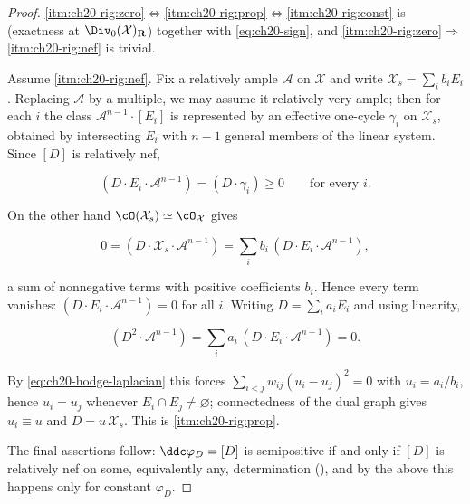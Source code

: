 \begin{proof}
\cref{itm:ch20-rig:zero}$\Leftrightarrow$\cref{itm:ch20-rig:prop}$\Leftrightarrow$\cref{itm:ch20-rig:const}
is  (exactness at
$\Div_0(\mathcal X)_{\mathbf R}$) together with
\eqref{eq:ch20-sign}, and
\cref{itm:ch20-rig:zero}$\Rightarrow$\cref{itm:ch20-rig:nef} is trivial.

Assume \cref{itm:ch20-rig:nef}.  Fix a relatively ample $\mathcal A$ on
$\mathcal X$ and write $\mathcal X_s=\sum_ib_iE_i$.  Replacing
$\mathcal A$ by a multiple, we may assume it relatively very ample; then
for each $i$ the class $\mathcal A^{n-1}\cdot[E_i]$ is represented by an
effective one-cycle $\gamma_i$ on $\mathcal X_s$, obtained by
intersecting $E_i$ with $n-1$ general members of the linear system.
Since $[D]$ is relatively nef,

\begin{equation}
\label{eq:ch20-rigidity-rows}
 (D\cdot E_i\cdot\mathcal A^{n-1})=(D\cdot\gamma_i)\geq0
 \qquad\text{for every }i .
\end{equation}

On the other hand $\cO(\mathcal X_s)\simeq\cO_{\mathcal X}$ gives

\[
 0=(D\cdot\mathcal X_s\cdot\mathcal A^{n-1})
  =\sum_ib_i\,(D\cdot E_i\cdot\mathcal A^{n-1}),
\]

a sum of nonnegative terms with positive coefficients $b_i$.  Hence every
term vanishes:
$(D\cdot E_i\cdot\mathcal A^{n-1})=0$ for all $i$.  Writing
$D=\sum_ia_iE_i$ and using linearity,

\[
 (D^2\cdot\mathcal A^{n-1})=\sum_ia_i\,(D\cdot E_i\cdot\mathcal A^{n-1})=0 .
\]

By \eqref{eq:ch20-hodge-laplacian} this forces
$\sum_{i<j}w_{ij}(u_i-u_j)^2=0$ with $u_i=a_i/b_i$, hence $u_i=u_j$
whenever $E_i\cap E_j\neq\varnothing$; connectedness of the dual graph
gives $u_i\equiv u$ and $D=u\,\mathcal X_s$.  This is
\cref{itm:ch20-rig:prop}.

The final assertions follow: $\ddc\varphi_D=[D]$ is semipositive if and
only if $[D]$ is relatively nef on some, equivalently any, determination
(), and by the above this happens
only for constant $\varphi_D$.
\end{proof}

